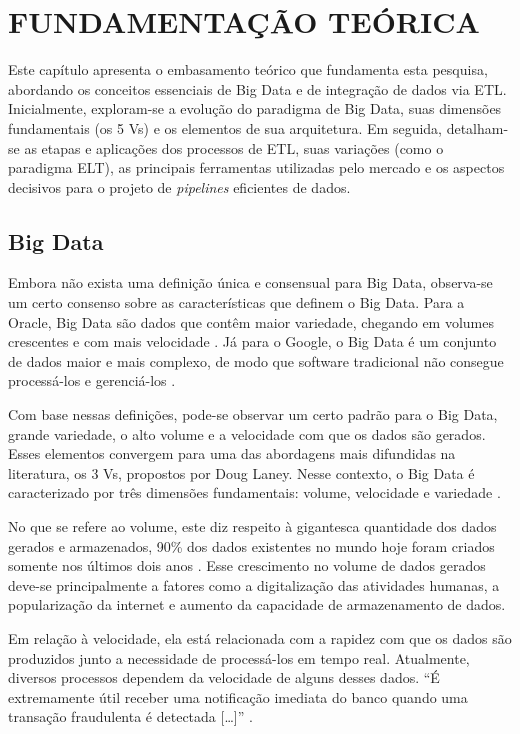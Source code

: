 
\chapter{FUNDAMENTAÇÃO TEÓRICA}
\thispagestyle{myheadings}

Este capítulo apresenta o embasamento teórico que fundamenta esta pesquisa, abordando os 
conceitos essenciais de Big Data e de integração de dados via ETL. 
Inicialmente, exploram-se a evolução do paradigma de 
Big Data, suas dimensões fundamentais (os 5 Vs) e os elementos de sua arquitetura. 
Em seguida, detalham-se as etapas e aplicações dos processos de ETL, suas variações 
(como o paradigma ELT), as principais ferramentas utilizadas pelo mercado e os aspectos 
decisivos para o projeto de \textit{pipelines} eficientes de dados.

\section{Big Data}
\label{sec:big-data}

Embora não exista uma definição única e consensual para Big Data, observa-se um certo 
consenso sobre as características que definem o Big Data. Para a Oracle, Big Data são 
dados que contêm maior variedade, chegando em volumes crescentes e com mais velocidade 
\cite{oracle_bigdata}. Já para o Google, o Big Data é um conjunto de dados maior e mais 
complexo, de modo que software tradicional não consegue processá-los e gerenciá-los 
\cite{googlecloud2025bigdata}.

Com base nessas definições, pode-se observar um certo padrão para o Big Data, grande 
variedade, o alto volume e a velocidade com que os dados são gerados. Esses elementos 
convergem para uma das abordagens mais difundidas na literatura, os 3 Vs, propostos por
Doug Laney. Nesse contexto, o Big Data é caracterizado por três dimensões fundamentais: 
volume, velocidade e variedade \cite{laney2001}.

No que se refere ao volume, este diz respeito à gigantesca quantidade dos dados gerados e 
armazenados, 90\% dos dados existentes no mundo hoje foram criados somente nos últimos dois 
anos \cite{sherman2015business}. Esse crescimento no volume de dados gerados deve-se principalmente a 
fatores como a digitalização das atividades humanas, a popularização da internet e aumento 
da capacidade de armazenamento de dados.

Em relação à velocidade, ela está relacionada com a rapidez com que os dados são produzidos 
junto a necessidade de processá-los em tempo real. Atualmente, diversos processos dependem da velocidade de 
alguns desses dados. ``É extremamente útil receber uma notificação imediata do banco quando
uma transação fraudulenta é detectada […]'' \cite[p. 26]{sherman2015business}.

